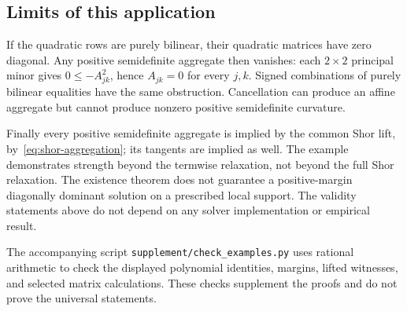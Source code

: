 \subsection{Limits of this application}

If the quadratic rows are purely bilinear, their quadratic matrices
have zero diagonal. Any positive semidefinite aggregate then
vanishes: each $2\times2$ principal minor gives
$0\leq-A_{jk}^2$, hence $A_{jk}=0$ for every $j,k$.
Signed combinations of purely bilinear equalities have the same
obstruction. Cancellation can produce an affine aggregate but
cannot produce nonzero positive semidefinite curvature.

Finally every positive semidefinite aggregate is implied by the
common Shor lift, by~\eqref{eq:shor-aggregation}; its tangents are
implied as well. The example demonstrates strength beyond the
termwise relaxation, not beyond the full Shor relaxation. The
existence theorem does not guarantee a positive-margin diagonally
dominant solution on a prescribed local support. The validity
statements above do not depend on any solver implementation or
empirical result.

The accompanying script \texttt{supplement/check\_examples.py}
uses rational arithmetic to check the displayed polynomial
identities, margins, lifted witnesses, and selected matrix
calculations. These checks supplement the proofs and do not prove the
universal statements.
